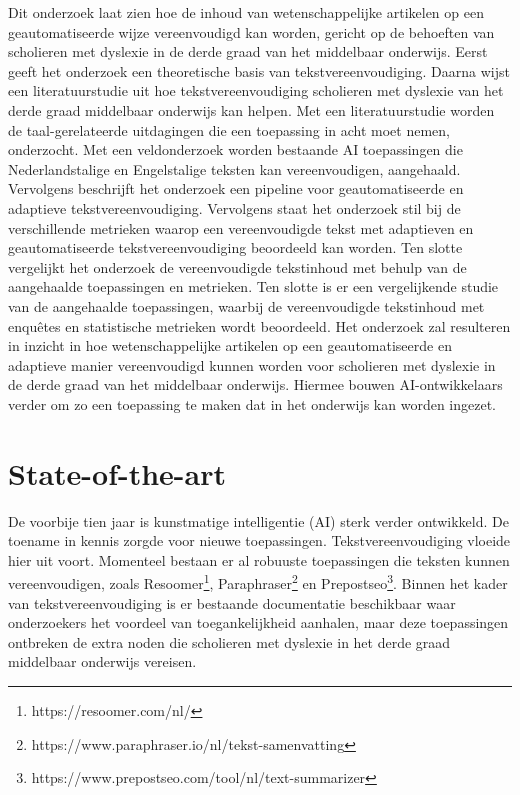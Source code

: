 Dit onderzoek laat zien hoe de inhoud van wetenschappelijke artikelen op een geautomatiseerde wijze vereenvoudigd kan worden, gericht op de behoeften van scholieren met dyslexie in de derde graad van het middelbaar onderwijs. Eerst geeft het onderzoek een theoretische basis van tekstvereenvoudiging. Daarna wijst een literatuurstudie uit hoe tekstvereenvoudiging scholieren met dyslexie van het derde graad middelbaar onderwijs kan helpen. Met een literatuurstudie worden de taal-gerelateerde uitdagingen die een toepassing in acht moet nemen, onderzocht. Met een veldonderzoek worden bestaande AI toepassingen die Nederlandstalige en Engelstalige teksten kan vereenvoudigen, aangehaald. Vervolgens beschrijft het onderzoek een pipeline voor geautomatiseerde en adaptieve tekstvereenvoudiging. Vervolgens staat het onderzoek stil bij de verschillende metrieken waarop een vereenvoudigde tekst met adaptieven en geautomatiseerde tekstvereenvoudiging beoordeeld kan worden. Ten slotte vergelijkt het onderzoek de vereenvoudigde tekstinhoud met behulp van de aangehaalde toepassingen en metrieken. Ten slotte is er een vergelijkende studie van de aangehaalde toepassingen, waarbij de vereenvoudigde tekstinhoud met enquêtes en statistische metrieken wordt beoordeeld. Het onderzoek zal resulteren in inzicht in hoe wetenschappelijke artikelen op een geautomatiseerde en adaptieve manier vereenvoudigd kunnen worden voor scholieren met dyslexie in de derde graad van het middelbaar onderwijs. Hiermee bouwen AI-ontwikkelaars verder om zo een toepassing te maken dat in het onderwijs kan worden ingezet.




\section{State-of-the-art}%
\label{sec:state-of-the-art}

De voorbije tien jaar is kunstmatige intelligentie (AI) sterk verder ontwikkeld. De toename in kennis zorgde voor nieuwe toepassingen. Tekstvereenvoudiging vloeide hier uit voort. Momenteel bestaan er al robuuste toepassingen die teksten kunnen vereenvoudigen, zoals Resoomer\footnote{https://resoomer.com/nl/}, Paraphraser\footnote{https://www.paraphraser.io/nl/tekst-samenvatting} en Prepostseo\footnote{https://www.prepostseo.com/tool/nl/text-summarizer}. Binnen het kader van tekstvereenvoudiging is er bestaande documentatie beschikbaar waar onderzoekers het voordeel van toegankelijkheid aanhalen, maar deze toepassingen ontbreken de extra noden die scholieren met dyslexie in het derde graad middelbaar onderwijs vereisen.

